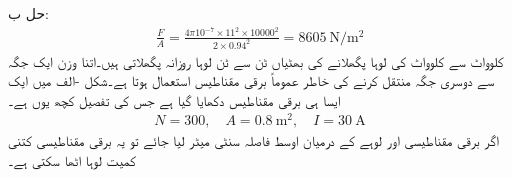 حل ب:
\begin{align*}
\frac{F}{A}=\frac{4\pi 10^{-7} \times 11^2 \times 10000^2 }{2 \times 0.94^2}=\SI{8605}{\newton \per \meter \squared}
\end{align*}
%
  کلوواٹ سے   کلوواٹ کی لوہا پگھلانے کی بھٹیاں  ٹن سے  ٹن لوہا روزانہ پگھلاتی ہیں۔اتنا وزن ایک جگہ سے دوسری جگہ منتقل کرنے کی خاطر عموماً برقی مقناطیس استعمال ہوتا ہے۔شکل -الف میں ایک ایسا ہی برقی مقناطیس دکھایا گیا ہے جس کی تفصیل کچھ یوں ہے۔
\begin{align*}
N=300, \quad A=\SI{0.8}{\meter \squared}, \quad I=\SI{30}{\ampere}
\end{align*}
اگر برقی مقناطیسی اور لوہے کے درمیان اوسط فاصلہ  سنٹی میٹر لیا جائے تو یہ برقی مقناطیسی کتنی کمیت لوہا اٹھا سکتی ہے۔
